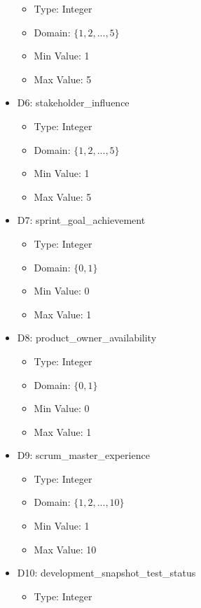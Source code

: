 \documentclass{article}
\begin{document}
\begin{itemize}
        \begin{itemize}
            \item Type: Integer
            \item Domain: $\{1, 2, ..., 5\}$
            \item Min Value: 1
            \item Max Value: 5
        \end{itemize}
    \item D6: stakeholder\_influence
        \begin{itemize}
            \item Type: Integer
            \item Domain: $\{1, 2, ..., 5\}$
            \item Min Value: 1
            \item Max Value: 5
        \end{itemize}
    \item D7: sprint\_goal\_achievement
        \begin{itemize}
            \item Type: Integer
            \item Domain: $\{0, 1\}$
            \item Min Value: 0
            \item Max Value: 1
        \end{itemize}
    \item D8: product\_owner\_availability
        \begin{itemize}
            \item Type: Integer
            \item Domain: $\{0, 1\}$
            \item Min Value: 0
            \item Max Value: 1
        \end{itemize}
    \item D9: scrum\_master\_experience
        \begin{itemize}
            \item Type: Integer
            \item Domain: $\{1, 2, ..., 10\}$
            \item Min Value: 1
            \item Max Value: 10
        \end{itemize}
    \item D10: development\_snapshot\_test\_status
        \begin{itemize}
            \item Type: Integer

\end{itemize}
\end{itemize}
\end{document}
